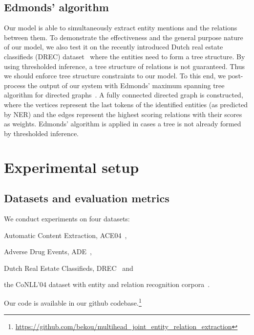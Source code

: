 \documentclass[review]{elsarticle}
\begin{document}
\subsection{Edmonds' algorithm}
\label{subsec:edmond}

\noindent Our model is able to simultaneously extract entity mentions and the relations between them. To demonstrate the effectiveness and the general purpose nature of our model, we also test it on the recently introduced Dutch real estate classifieds (DREC) dataset~\citep{bekoulis:17} where the entities need to form a tree structure. By using thresholded inference, a tree structure of relations is not guaranteed. Thus we should enforce tree structure constraints to our model. To this end, we post-process the output of our system with Edmonds' maximum spanning tree algorithm for directed graphs~\citep{chu:65,edmond:68}. A fully connected directed graph  is constructed, where the vertices  represent the last tokens of the identified entities (as predicted by NER) and the edges  represent the highest scoring relations with their scores as weights. Edmonds' algorithm is applied in cases a tree is not already formed by thresholded inference.

\section{Experimental setup}
\label{sec:setup}
\subsection{Datasets and evaluation metrics}

\noindent We conduct experiments on four datasets:
\begin{enumerate*}[label=(\roman*)]
\item Automatic Content Extraction, ACE04~\citep{doddington:04},
\item Adverse Drug Events, ADE~\citep{gurulingappa:12b},
\item Dutch Real Estate Classifieds, DREC~\citep{bekoulis:17} and 
\item the CoNLL'04 dataset with entity and relation recognition corpora~\citep{roth:04}.
\end{enumerate*}
Our code is available in our github codebase.\footnote{\url{https://github.com/bekou/multihead_joint_entity_relation_extraction}}
\end{document}
